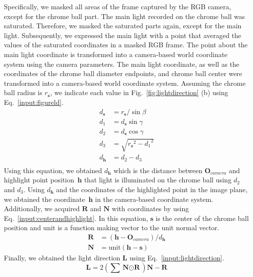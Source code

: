 \documentclass[preprint,12pt,authoryear]{elsarticle}
\begin{document}
Specifically, we masked all areas of the frame captured by the RGB camera, except for the chrome ball part. The main light recorded on the chrome ball was saturated. Therefore, we masked the saturated parts again, except for the main light. Subsequently, we expressed the main light with a point that averaged the values of the saturated coordinates in a masked RGB frame. The point about the main light coordinate is transformed into a camera-based world coordinate system using the camera parameters. The main light coordinate, as well as the coordinates of the chrome ball diameter endpoints, and chrome ball center were transformed into a camera-based world coordinate system. Assuming the chrome ball radius is $r_{\textbf{s}}$, we indicate each value in Fig.~\ref{fig:lightdirection} (b) using Eq.~\ref{input:figureld}.
\begin{equation}
\begin{aligned}
d_{\textbf{s}} &= r_{\textbf{s}}/\sin{\beta} \\
d_{1} &= d_{\textbf{s}}\sin{\gamma} \\
d_{2} &= d_{\textbf{s}}\cos{\gamma} \\
d_{3} &= \sqrt{{r_{\textbf{s}}}^{2}-{d_{1}}^{2}} \\
d_{\textbf{h}} &= d_{2}-d_{3} \\
\end{aligned}
\label{input:figureld}
\end{equation}
Using this equation, we obtained $d_{\textbf{h}}$ which is the distance between $\textbf{O}_{camera}$ and highlight point position~$\textbf{h}$ that light is illuminated on the chrome ball using $d_{2}$ and $d_{3}$. Using $d_{\textbf{h}}$ and the coordinates of the highlighted point in the image plane, we obtained the coordinate~$\textbf{h}$ in the camera-based coordinate system. Additionally, we acquired $\textbf{R}$ and $\textbf{N}$ with coordinates by using Eq.~\ref{input:centerandhighlight}. In this equation, $\textbf{s}$ is the center of the chrome ball position and $\text{unit}$ is a function making vector to the unit normal vector.
\begin{equation}
\begin{aligned}
\textbf{R} &= (\textbf{h} - \textbf{O}_{camera})/d_{\textbf{h}} \\
\textbf{N} &= \text{unit}(\textbf{h} - \textbf{s})
\end{aligned}
\label{input:centerandhighlight}
\end{equation}
Finally, we obtained the light direction $\textbf{L}$ using Eq.~\ref{input:lightdirection}.
\begin{equation}
\textbf{L} = 2(\sum{\textbf{N} \odot \textbf{R}})\textbf{N} - \textbf{R}
\label{input:lightdirection}
\end{equation}
\end{document}

